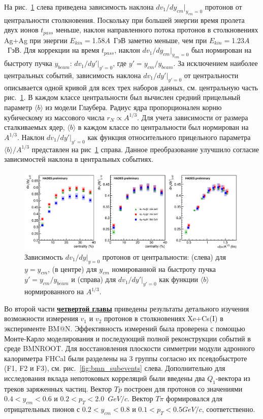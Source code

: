 На рис.~\ref{fig:hades_dv1dy_many_plot} слева приведена зависимость наклона $dv_1/dy_{cm}|_{y_{cm}=0}$ протонов от центральности столкновения.
Поскольку при большей энергии время пролета двух ионов $t_{pass}$ меньше, наклон направленного потока протонов в столкновениях Ag+Ag при энергии $E_{kin}=$1.58$A$~ГэВ 
заметно меньше, чем при $E_{kin}=$1.23$A$~ГэВ. 
Для коррекции на время $t_{pass}$, наклон  $dv_1/dy_{cm}|_{y_{cm}=0}$ был нормирован на быстроту пучка $y_{beam}$: $dv_1/dy'|_{y'=0}$, где $y'=y_{cm}/y_{beam}$.
За исключением наиболее центральных событий, зависимость наклона $dv_1/dy'|_{y'=0}$ от центральности описывается одной кривой для всех трех наборов данных,
см. центральную часть рис.~\ref{fig:hades_dv1dy_many_plot}.
В каждом классе центральности был вычислен средний прицельный параметр $\langle b \rangle$ из модели Глаубера.
Радиус ядра пропорционален корню кубическому из массового числа $r_N \propto A^{1/3}$.
Для учета зависимости от размера сталкиваемых ядер,  $\langle b \rangle$ в каждом классе по центральности был нормирован на $A^{1/3}$.
Наклон $dv_1/dy'|_{y'=0}$ как функция относительного прицельного параметра
$ \langle b \rangle / A^{1/3}$ представлен на рис~\ref{fig:hades_dv1dy_many_plot} справа.
Данное преобразование улучшило согласие зависимостей наклона в центральных событиях. 
%
\begin{figure}[h]
\begin{center}
\includegraphics[width=0.9\linewidth]{images/dv1dy_many_plot.png}
\caption{Зависимость $dv_1/dy|_{y=0}$ протонов от центральности: (слева) для $y=y_{cm}$, (в центре) для $y_{cm}$ номированной 
на быстроту пучка $y' = y_{cm}/y_{beam}$ и (справа) для $dv_1/dy'|_{y'=0}$ как функции $\langle b \rangle$ нормированного на  $A^{1/3}$.}
\label{fig:hades_dv1dy_many_plot}
\end{center}
\end{figure}


Во второй части \underline{\textbf{четвертой главы}} приведены результаты
детального изучения возможности измерения $v_1$ и $v_2$ протонов в столкновениях Xe+Cs(I)   в эксперименте  BM@N.
Эффективность  измерений была проверена  с помощью Монте-Карло моделирования   и последующий
полной реконструкции событий в среде BMNROOT. 
Для восстановления плоскости симметрии модули адронного калориметра FHCal были разделены на 3 группы согласно их псевдобыстроте (F1, F2 и F3), см. 
рис.~\ref{fig:bmn_subevents} слева.
Дополнительно для исследования вклада непотоковых корреляций были введены два $Q_1$-вектора из треков заряженных частиц. 
Вектор $Tp$ построен для протонов со значениями $0.4<y_{cm}<0.6$ и  $0.2<p_{T}<2.0$~$GeV/c$.
Вектор $T\pi$ формировался для отрицательных пионов с  $0.2<y_{cm}<0.8$ и $0.1<p_T<0.5 GeV/c$, соответственно.



